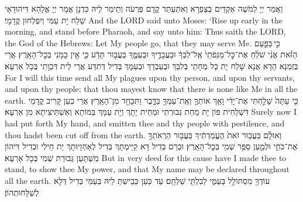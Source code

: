 {{וַאֲמַר יְיָ לְמֹשֶׁה אַקְדֵּים בְּצַפְרָא וְאִתְעַתַּד קֳדָם פַּרְעֹה וְתֵימַר לֵיהּ כִּדְנָן אֲמַר יְיָ אֱלָהָא דִּיהוּדָאֵי שַׁלַּח יָת עַמִּי וְיִפְלְחוּן קֳדָמָי׃}
{And the LORD said unto Moses: ‘Rise up early in the morning, and stand before Pharaoh, and say unto him: Thus saith the LORD, the God of the Hebrews: Let My people go, that they may serve Me.}{}
{כִּ֣י \legarmeh  בַּפַּ֣עַם הַזֹּ֗את אֲנִ֨י שֹׁלֵ֜חַ אֶת־כׇּל־מַגֵּפֹתַי֙ אֶֽל־לִבְּךָ֔ וּבַעֲבָדֶ֖יךָ וּבְעַמֶּ֑ךָ בַּעֲב֣וּר תֵּדַ֔ע כִּ֛י אֵ֥ין כָּמֹ֖נִי בְּכׇל־הָאָֽרֶץ׃
}
{אֲרֵי בְּזִמְנָא הָדָא אֲנָא שָׁלַח יָת כָּל מַחָתַי בְּלִבָּךְ וּבְעַבְדָךְ וּבְעַמָּךְ בְּדִיל דְּתִדַּע אֲרֵי לֵית דִּכְוָתִי בְּכָל אַרְעָא׃}
{For I will this time send all My plagues upon thy person, and upon thy servants, and upon thy people; that thou mayest know that there is none like Me in all the earth.}{}
{כִּ֤י עַתָּה֙ שָׁלַ֣חְתִּי אֶת־יָדִ֔י וָאַ֥ךְ אוֹתְךָ֛ וְאֶֽת־עַמְּךָ֖ בַּדָּ֑בֶר וַתִּכָּחֵ֖ד מִן־הָאָֽרֶץ׃
}
{אֲרֵי כְעַן קָרִיב קֳדָמַי דִּשְׁלַחִית פּוֹן יָת מַחַת גְּבוּרְתִי וּמְחֵית יָתָךְ וְיָת עַמָּךְ בְּמוֹתָא וְאִשְׁתֵּיצִיתָא מִן אַרְעָא׃}
{Surely now I had put forth My hand, and smitten thee and thy people with pestilence, and thou hadst been cut off from the earth.}{}
{וְאוּלָ֗ם בַּעֲב֥וּר זֹאת֙ הֶעֱמַדְתִּ֔יךָ בַּעֲב֖וּר הַרְאֹתְךָ֣ אֶת־כֹּחִ֑י וּלְמַ֛עַן סַפֵּ֥ר שְׁמִ֖י בְּכׇל־הָאָֽרֶץ׃}
{וּבְרַם בְּדִיל דָּא קַיֵּימְתָּךְ בְּדִיל לְאַחְזָיוּתָךְ יָת חֵילִי וּבְדִיל דִּיהוֹן מִשְׁתָּעַן גְּבוּרַת שְׁמִי בְּכָל אַרְעָא׃}
{But in very deed for this cause have I made thee to stand, to show thee My power, and that My name may be declared throughout all the earth.}{}
{עוֹדְךָ֖ מִסְתּוֹלֵ֣ל בְּעַמִּ֑י לְבִלְתִּ֖י שַׁלְּחָֽם׃
}
{עַד כְּעַן כְּבֵישְׁתְּ לֵיהּ בְּעַמִּי בְּדִיל דְּלָא לְשַׁלָּחוּתְהוֹן׃}
}
